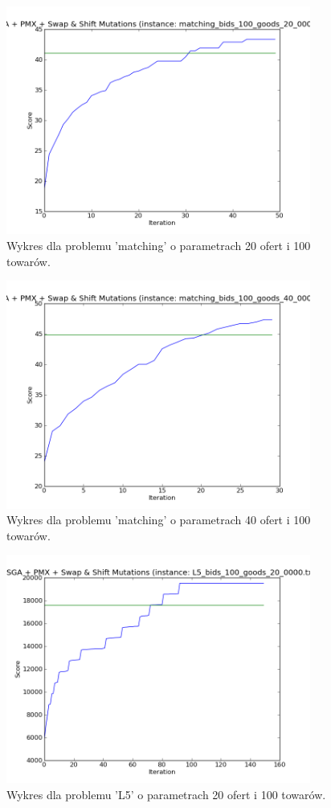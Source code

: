 \begin{frame}
    \begin{figure}
        \centering
        \includegraphics[width=10cm]{wykresy/matching_bids_100_goods_20_0000_txt_1.png}
        \caption{Wykres dla problemu 'matching' o parametrach 20 ofert i 100 towarów.}
    \end{figure}
\end{frame}

\begin{frame}
    \begin{figure}
        \centering
        \includegraphics[width=10cm]{wykresy/matching_bids_100_goods_40_0000_txt_3.png}
        \caption{Wykres dla problemu 'matching' o parametrach 40 ofert i 100 towarów.}
    \end{figure}
\end{frame}

\begin{frame}
    \begin{figure}
        \centering
        \includegraphics[width=10cm]{wykresy/L5_bids_100_goods_20_0000_txt_1.png}
        \caption{Wykres dla problemu 'L5' o parametrach 20 ofert i 100 towarów.}
    \end{figure}
\end{frame}
